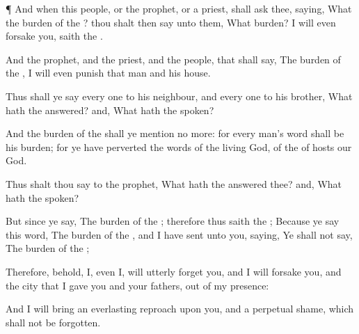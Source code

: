 {\par }{\PP {}¶ And when this
people, or the
prophet, or a
priest, shall
ask thee,
saying, What
{} the
burden of the
{}? thou shalt then
say unto them, What
burden? I will even
forsake you,
saith the
{}.

And
{} the
prophet, and the
priest, and the
people, that shall
say, The
burden of the
{}, I will even
punish that
man and his
house.

Thus shall ye
say every
one to his
neighbour, and every
one to his
brother, What hath the
{}
answered? and, What hath the
{}
spoken?

And the
burden of the
{} shall ye
mention no more: for every
man’s
word shall be his
burden; for ye have
perverted the
words of the
living
God, of the
{} of
hosts our
God.

Thus shalt thou
say to the
prophet, What hath the
{}
answered thee? and, What hath the
{}
spoken?

But since ye
say, The
burden of the
{}; therefore thus
saith the
{}; Because ye
say this
word, The
burden of the
{}, and I have
sent unto you,
saying, Ye shall not
say, The
burden of the
{};

Therefore, behold, I, even I, will
utterly
forget you, and I will
forsake you, and the
city that I
gave you and your
fathers,
{} out of my
presence:

And I will
bring an
everlasting
reproach upon you, and a
perpetual
shame, which shall not be
forgotten.




\par }
